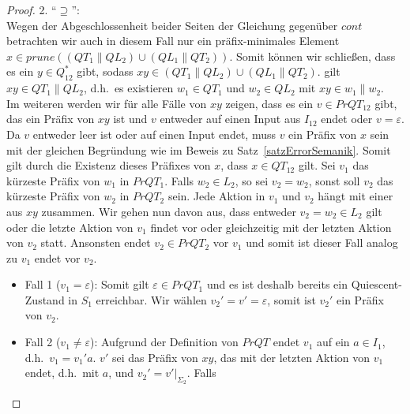 \begin{proof}
  2. ``$\supseteq$'':\\
  Wegen der Abgeschlossenheit beider Seiten der Gleichung gegenüber $cont$
  betrachten wir auch in diesem Fall nur ein präfix-minimales Element $x\in
  prune((QT_1\|QL_2)\cup (QL_1\|QT_2))$. Somit können wir schließen, dass es
  ein $y\in Q_{12}^*$ gibt, sodass $xy\in (QT_1\|QL_2)\cup (QL_1\|QT_2)$.
  \OBdA{} gilt $xy\in QT_1\|QL_2$, d.h.\ es existieren $w_1\in QT_1$ und
  $w_2\in QL_2$ mit $xy\in w_1\| w_2$.\\
  Im weiteren werden wir für alle Fälle von $xy$ zeigen, dass es ein $v\in
  PrQT_{12}$ gibt, das ein Präfix von $xy$ ist und $v$ entweder auf einen Input
  aus $I_{12}$ endet oder $v=\varepsilon$. Da $v$ entweder leer ist oder auf
  einen Input endet, muss $v$ ein Präfix von $x$ sein mit der gleichen
  Begründung wie im Beweis zu Satz~\ref{satzErrorSemanik}. Somit gilt durch die
  Existenz dieses Präfixes von $x$, dass $x\in QT_{12}$ gilt. Sei $v_1$ das
  kürzeste Präfix von $w_1$ in $PrQT_1$. Falls $w_2\in L_2$, so sei $v_2=w_2$,
  sonst soll $v_2$ das kürzeste Präfix von $w_2$ in $PrQT_2$ sein. Jede Aktion
  in $v_1$ und $v_2$ hängt mit einer aus $xy$ zusammen. Wir gehen nun davon
  aus, dass entweder $v_2=w_2\in L_2$ gilt oder die letzte Aktion von $v_1$
  findet vor oder gleichzeitig mit der letzten Aktion von $v_2$ statt.
  Ansonsten endet $v_2\in PrQT_2$ vor $v_1$ und somit ist dieser Fall analog zu
  $v_1$ endet vor $v_2$.
  \begin{itemize}
    \item Fall 1 ($v_1=\varepsilon$): Somit gilt $\varepsilon\in PrQT_1$ und es
      ist deshalb bereits ein Quiescent-Zustand in $S_1$ erreichbar. Wir wählen
      $v_2'=v'=\varepsilon$, somit ist $v_2'$ ein Präfix von $v_2$.
    \item Fall 2 ($v_1\neq \varepsilon$): Aufgrund der Definition von $PrQT$
      endet $v_1$ auf ein $a\in I_1$, d.h.\ $v_1=v_1'a$. $v'$ sei das Präfix
      von $xy$, das mit der letzten Aktion von $v_1$ endet, d.h.\ mit $a$, und
      $v_2'=v'|_{\Sigma _2}$. Falls 
  \end{itemize}


\end{proof}
